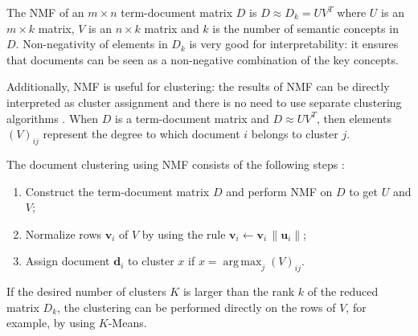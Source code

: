 The NMF of an $m \times n$ term-document matrix $D$ is $D \approx D_k = U  V^T$
where $U$ is an $m \times k$ matrix, $V$ is an $n \times k$ matrix and
$k$ is the number of semantic concepts in $D$.
Non-negativity of elements in $D_k$ is very good for interpretability: it
ensures that documents can be seen as a non-negative combination of
the key concepts.

Additionally, NMF is useful for clustering: the results of NMF can
be directly interpreted as cluster assignment and there is no need
to use separate clustering algorithms \cite{xu2003document}. When $D$ is a
term-document matrix and $D \approx U V^T$, then elements $(V)_{ij}$
represent the degree to which document $i$ belongs to cluster $j$.

The document clustering using NMF consists of the following steps \cite{xu2003document}:

\begin{enumerate}
  \item Construct the term-document matrix $D$ and perform NMF on $D$ to get $U$ and $V$;
  \item Normalize rows $\mathbf v_i$ of $V$ by using the rule $\mathbf v_i \leftarrow \mathbf v_i \, \| \mathbf u_i \|$;
  \item Assign document $\mathbf d_i$ to cluster $x$ if $x = \operatorname{arg \, max}_j (V)_{ij}$.
\end{enumerate}

If the desired number of clusters $K$ is larger than the rank $k$ of the
reduced matrix $D_k$, the clustering can be performed directly on the rows
of $V$, for example, by using $K$-Means.

